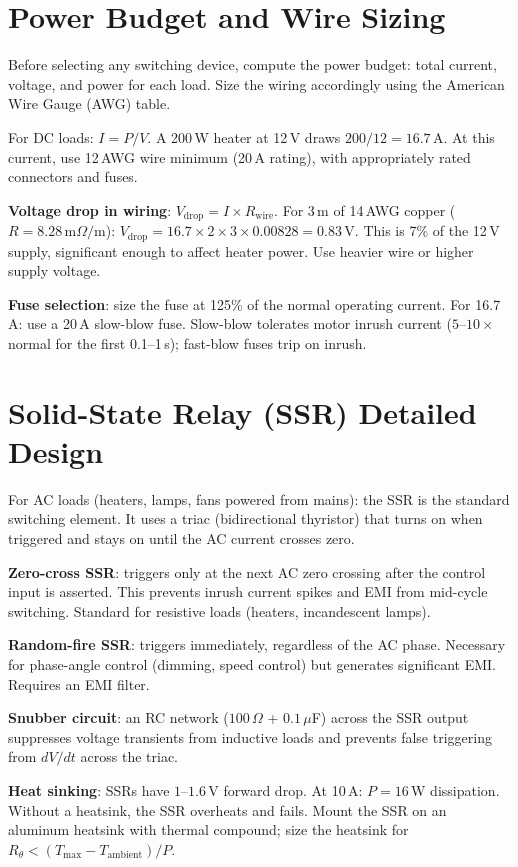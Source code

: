 \documentclass[11pt,letterpaper,twoside,openany]{book}
\begin{document}
\section{Power Budget and Wire Sizing}
Before selecting any switching device, compute the power budget: total current, voltage, and power for each load. Size the wiring accordingly using the American Wire Gauge (AWG) table.

For DC loads: $I = P/V$. A 200\,W heater at 12\,V draws $200/12 = 16.7$\,A. At this current, use 12\,AWG wire minimum (20\,A rating), with appropriately rated connectors and fuses.

\textbf{Voltage drop in wiring}: $V_{\text{drop}} = I \times R_{\text{wire}}$. For 3\,m of 14\,AWG copper ($R = 8.28\,\text{m}\Omega/\text{m}$): $V_{\text{drop}} = 16.7 \times 2 \times 3 \times 0.00828 = 0.83$\,V. This is 7\% of the 12\,V supply, significant enough to affect heater power. Use heavier wire or higher supply voltage.

\textbf{Fuse selection}: size the fuse at 125\% of the normal operating current. For 16.7\,A: use a 20\,A slow-blow fuse. Slow-blow tolerates motor inrush current ($5$--$10\times$ normal for the first 0.1--1\,s); fast-blow fuses trip on inrush.

\section{Solid-State Relay (SSR) Detailed Design}
For AC loads (heaters, lamps, fans powered from mains): the SSR is the standard switching element. It uses a triac (bidirectional thyristor) that turns on when triggered and stays on until the AC current crosses zero.

\textbf{Zero-cross SSR}: triggers only at the next AC zero crossing after the control input is asserted. This prevents inrush current spikes and EMI from mid-cycle switching. Standard for resistive loads (heaters, incandescent lamps).

\textbf{Random-fire SSR}: triggers immediately, regardless of the AC phase. Necessary for phase-angle control (dimming, speed control) but generates significant EMI. Requires an EMI filter.

\textbf{Snubber circuit}: an RC network ($100\,\Omega$ + $0.1\,\mu$F) across the SSR output suppresses voltage transients from inductive loads and prevents false triggering from $dV/dt$ across the triac.

\textbf{Heat sinking}: SSRs have $1$--$1.6$\,V forward drop. At 10\,A: $P = 16$\,W dissipation. Without a heatsink, the SSR overheats and fails. Mount the SSR on an aluminum heatsink with thermal compound; size the heatsink for $R_{\theta} < (T_{\max} - T_{\text{ambient}})/P$.
\end{document}
